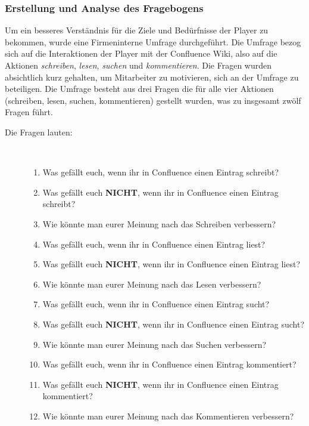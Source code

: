 \documentclass[a4paper,12pt,twoside]{scrartcl}
\begin{document}
\subsubsection{Erstellung und Analyse des Fragebogens}
\label{Fragebogen}
Um ein besseres Verständnis für die Ziele und Bedürfnisse der Player zu bekommen, wurde eine Firmeninterne Umfrage durchgeführt. Die Umfrage bezog sich auf die Interaktionen der Player mit der Confluence Wiki, also auf die Aktionen \textit{schreiben}, \textit{lesen}, \textit{suchen} und \textit{kommentieren}. Die Fragen wurden absichtlich kurz gehalten, um Mitarbeiter zu motivieren, sich an der Umfrage zu beteiligen. Die Umfrage besteht aus drei Fragen die für alle vier Aktionen (schreiben, lesen, suchen, kommentieren) gestellt wurden, was zu insgesamt zwölf Fragen führt.
\begin{description}
   \item[Die Fragen lauten:]~\par
   \begin{enumerate}
      \item Was gefällt euch, wenn ihr in Confluence einen Eintrag schreibt?
      \item Was gefällt euch \textbf{NICHT}, wenn ihr in Confluence einen Eintrag schreibt?
      \item Wie könnte man eurer Meinung nach das Schreiben verbessern?
      
      \item Was gefällt euch, wenn ihr in Confluence einen Eintrag liest?
      \item Was gefällt euch \textbf{NICHT}, wenn ihr in Confluence einen Eintrag liest?
      \item Wie könnte man eurer Meinung nach das Lesen verbessern?
      
      \item Was gefällt euch, wenn ihr in Confluence einen Eintrag sucht?
      \item Was gefällt euch \textbf{NICHT}, wenn ihr in Confluence einen Eintrag sucht?
      \item Wie könnte man eurer Meinung nach das Suchen verbessern?
      
      \item Was gefällt euch, wenn ihr in Confluence einen Eintrag kommentiert?
      \item Was gefällt euch \textbf{NICHT}, wenn ihr in Confluence einen Eintrag kommentiert?
      \item Wie könnte man eurer Meinung nach das Kommentieren verbessern?
   \end{enumerate}
\end{description}
\end{document}
